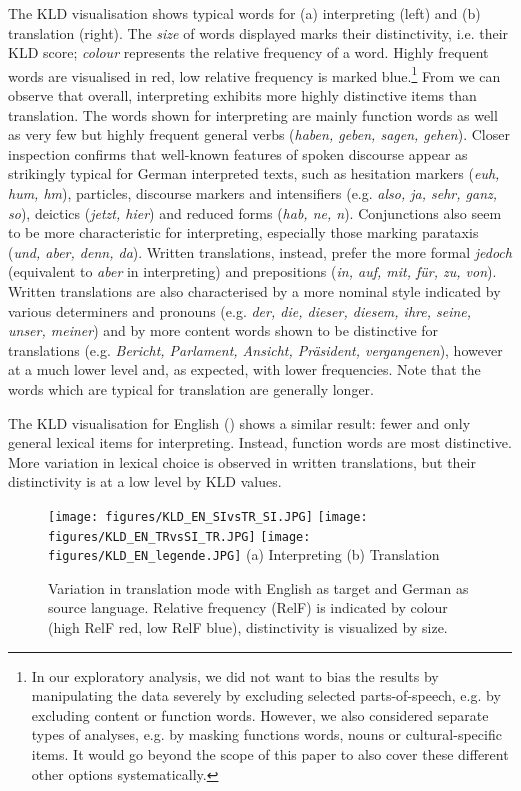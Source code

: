 \documentclass[output=paper,colorlinks,citecolor=brown]{langscibook}
\begin{document}
The KLD visualisation shows typical words for (a) interpreting (left) and (b) translation (right). The \textit{size} of words displayed marks their distinctivity, i.e. their KLD score; \textit{ colour} represents the relative frequency of a word. Highly frequent words are visualised in red, low relative frequency is marked blue.\footnote{In our exploratory analysis, we did not want to bias the results by manipulating the data severely by excluding selected parts-of-speech, e.g. by excluding content or function words. However, we also considered separate types of analyses, e.g. by masking functions words, nouns or cultural-specific items. It would go beyond the scope of this paper to also cover these different other options systematically.} From  we can observe that overall, interpreting exhibits more highly distinctive items than translation. The words shown for interpreting are mainly function words as well as very few but highly frequent general verbs (\textit{haben, geben, sagen, gehen}). Closer inspection confirms that well-known features of spoken discourse appear as strikingly typical for German interpreted texts, such as hesitation markers (\textit{euh, hum, hm}), particles, discourse markers and intensifiers (e.g. \textit{also, ja, sehr, ganz, so}), deictics (\textit{jetzt, hier}) and reduced forms (\textit{hab, ne, n}). Conjunctions also seem to be more characteristic for interpreting, especially those marking parataxis  (\textit{und, aber, denn, da}). Written translations, instead, prefer the more formal \textit{jedoch} (equivalent to \textit{aber} in interpreting) and  prepositions (\textit{in, auf, mit, für, zu, von}). Written translations are also characterised by a more nominal style indicated by various determiners and pronouns (e.g. \textit{der, die, dieser, diesem, ihre, seine, unser, meiner}) and by more content words shown to be distinctive for translations (e.g. \textit{Bericht, Parlament, Ansicht, Präsident, vergangenen}), however at a much lower level and, as expected, with lower frequencies. Note that the words which are typical for translation are generally longer.

The KLD visualisation for English () shows a similar result: fewer and only general lexical items for interpreting. Instead, function words are most distinctive. More variation in lexical choice is observed in written translations, but their distinctivity is at a low level by KLD values.  

\begin{figure}
\texttt{[image: figures/KLD\_EN\_SIvsTR\_SI.JPG]}
\texttt{[image: figures/KLD\_EN\_TRvsSI\_TR.JPG]}
\texttt{[image: figures/KLD\_EN\_legende.JPG]}
(a) Interpreting	\hspace{2cm} (b) Translation
\caption{\label{fig: EN SI vs TR} Variation in translation mode with English as target and German as source language. Relative frequency (RelF) is indicated by colour (high RelF red, low RelF blue), distinctivity is visualized by size.}
\label{fig:2}
\end{figure}
\end{document}
